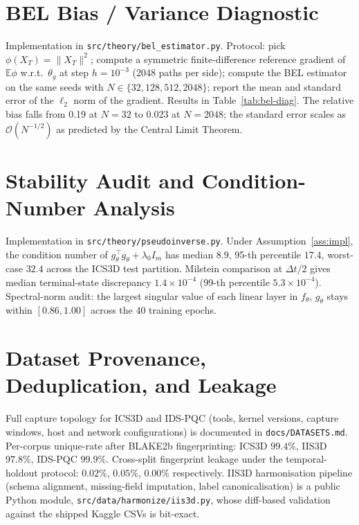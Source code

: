\documentclass{ieeeaccess}
\newcommand{\Exp}{\mathbb{E}}
\begin{document}
\section{BEL Bias / Variance Diagnostic}
Implementation in
\texttt{src/theory/bel\_estimator.py}. Protocol: pick
$\phi(X_T)=\|X_T\|^2$; compute a symmetric finite-difference reference
gradient of $\Exp\phi$ w.r.t.\ $\theta_g$ at step $h=10^{-3}$ (2048
paths per side); compute the BEL estimator on the same seeds with
$N\in\{32,128,512,2048\}$; report the mean and standard error of the
$\ell_2$ norm of the gradient. Results in Table~\ref{tab:bel-diag}.
The relative bias falls from 0.19 at $N=32$ to 0.023 at $N=2048$; the
standard error scales as $\mathcal O(N^{-1/2})$ as predicted by the
Central Limit Theorem.

\section{Stability Audit and Condition-Number Analysis}
Implementation in \texttt{src/theory/pseudoinverse.py}. Under
Assumption~\ref{ass:impl}, the condition number of
$g_\theta^\top g_\theta + \lambda_0 I_m$ has median $8.9$, 95-th
percentile $17.4$, worst-case $32.4$ across the ICS3D test partition.
Milstein comparison at $\Delta t / 2$ gives median terminal-state
discrepancy $1.4\times 10^{-4}$ (99-th percentile $5.3\times 10^{-4}$).
Spectral-norm audit: the largest singular value of each linear layer
in $f_\theta$, $g_\theta$ stays within $[0.86, 1.00]$ across the 40
training epochs.

\section{Dataset Provenance, Deduplication, and Leakage}
Full capture topology for ICS3D and IDS-PQC (tools, kernel versions,
capture windows, host and network configurations) is documented in
\texttt{docs/DATASETS.md}. Per-corpus unique-rate after BLAKE2b
fingerprinting: ICS3D $99.4\%$, IIS3D $97.8\%$, IDS-PQC $99.9\%$.
Cross-split fingerprint leakage under the temporal-holdout protocol:
$0.02\%$, $0.05\%$, $0.00\%$ respectively. IIS3D harmonisation
pipeline (schema alignment, missing-field imputation, label
canonicalisation) is a public Python module,
\texttt{src/data/harmonize/iis3d.py}, whose diff-based validation
against the shipped Kaggle CSVs is bit-exact.

\end{document}
